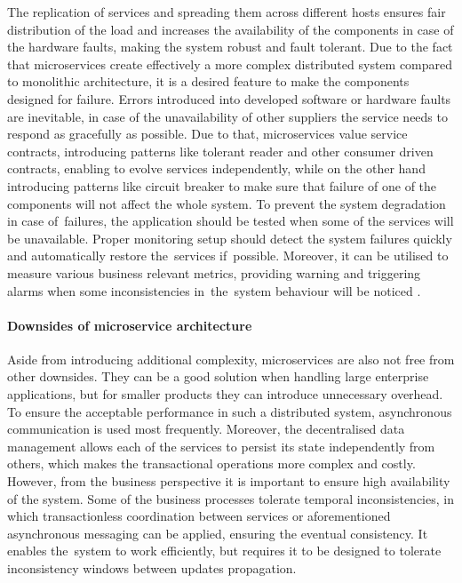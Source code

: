 The replication of services and spreading them across different hosts ensures fair distribution of the load and increases the availability of the components in case of the hardware faults, making the system robust and fault tolerant. Due to the fact that microservices create effectively a more complex distributed system compared to monolithic architecture, it is a desired feature to make the components designed for failure. Errors introduced into developed software or hardware faults are inevitable, in case of the unavailability of other suppliers the service needs to respond as gracefully as possible. Due to that, microservices value service contracts, introducing patterns like tolerant reader and other consumer driven contracts, enabling to evolve services independently, while on the other hand introducing patterns like circuit breaker to make sure that failure of one of the components will not affect the whole system. To prevent the system degradation in case of~failures, the application should be tested when some of the services will be unavailable. Proper monitoring setup should detect the system failures quickly and automatically restore the~services if~possible. Moreover, it can be utilised to measure various business relevant metrics, providing warning and triggering alarms when some inconsistencies in~the~system behaviour will be noticed \cite{MicroservicesHowToMakeYourApplicationScale}.

\paragraph{Downsides of microservice architecture}

Aside from introducing additional complexity, microservices are also not free from other downsides. They can be a good solution when handling large enterprise applications, but for smaller products they can introduce unnecessary overhead. To ensure the acceptable performance in such a distributed system, asynchronous communication is used most frequently. Moreover, the decentralised data management allows each of the services to persist its state independently from others, which makes the transactional operations more complex and costly. However, from the business perspective it is important to ensure high availability of the system. Some of the business processes tolerate temporal inconsistencies, in which transactionless coordination between services or aforementioned asynchronous messaging can be applied, ensuring the eventual consistency. It enables the~system to work efficiently, but requires it to be designed to tolerate inconsistency windows between updates propagation.


